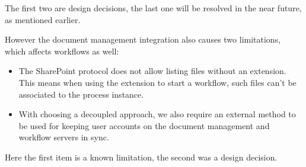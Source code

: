 The first two are design decisions, the last one will be resolved in the near
future, as mentioned earlier.

However the document management integration also causes two limitations, which affects workflows as well:

\begin{itemize}
\item The SharePoint protocol does not allow listing files without an
extension. This means when using the extension to start a workflow, such files
can't be associated to the process instance.
\item With choosing a decoupled approach, we also require an external method to
be used for keeping user accounts on the document management and workflow
servers in sync.
\end{itemize}

Here the first item is a known limitation, the second was a design decision.
